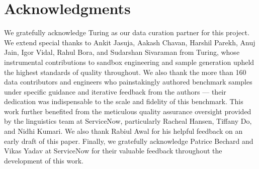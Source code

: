 \section{Acknowledgments}
We gratefully acknowledge Turing as our data curation partner for this project. We extend special thanks to Ankit Jasuja, Aakash Chavan, Harshil Parekh, Anuj Jain, Igor Vidal, Rahul Bora, and Sudarshan Sivaraman from Turing, whose instrumental contributions to sandbox engineering and sample generation upheld the highest standards of quality throughout. We also thank the more than 160 data contributors and engineers who painstakingly authored benchmark samples under specific guidance and iterative feedback from the authors — their dedication was indispensable to the scale and fidelity of this benchmark.
This work further benefited from the meticulous quality assurance oversight provided by the linguistics team at ServiceNow, particularly Racheal Hansen, Tiffany Do, and Nidhi Kumari. We also thank Rabiul Awal for his helpful feedback on an early draft of this paper. Finally, we gratefully acknowledge Patrice Bechard and Vikas Yadav at ServiceNow for their valuable feedback throughout the development of this work.